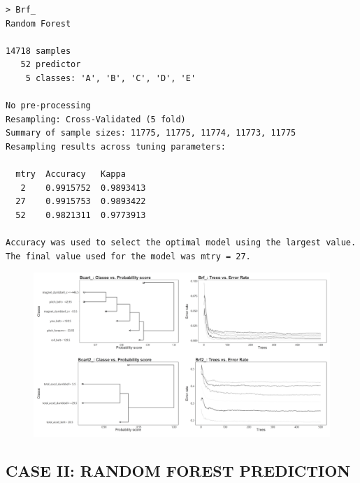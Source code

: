 \documentclass[10pt, twoside]{article}
\begin{document}
\begin{verbatim}
> Brf_
Random Forest

14718 samples
   52 predictor
    5 classes: 'A', 'B', 'C', 'D', 'E'

No pre-processing
Resampling: Cross-Validated (5 fold)
Summary of sample sizes: 11775, 11775, 11774, 11773, 11775
Resampling results across tuning parameters:

  mtry  Accuracy   Kappa
   2    0.9915752  0.9893413
  27    0.9915753  0.9893422
  52    0.9821311  0.9773913

Accuracy was used to select the optimal model using the largest value.
The final value used for the model was mtry = 27.
\end{verbatim}


\begin{figure}[H]
\centering
\includegraphics[scale=0.359]{plot2}
\caption{}
\end{figure}


\newpage

\begin{center}
\section{CASE II: RANDOM FOREST PREDICTION}
\vspace{-3ex}
\end{center}
\end{document}
